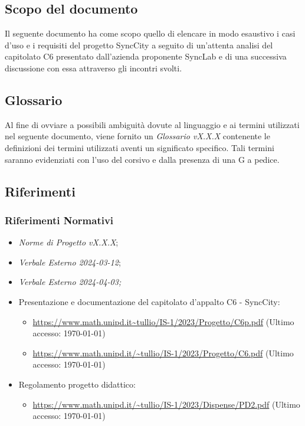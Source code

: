 \documentclass[8pt]{article}
\begin{document}
\subsection{Scopo del documento}
Il seguente documento ha come scopo quello di elencare in modo esaustivo i casi d'uso e i requisiti
del progetto SyncCity a seguito di un'attenta analisi del capitolato C6 presentato dall'azienda proponente SyncLab e di una successiva discussione con essa attraverso gli incontri svolti.

\subsection{Glossario}
Al fine di ovviare a possibili ambiguità dovute al linguaggio e ai termini utilizzati nel seguente
documento, viene fornito un \textit{Glossario vX.X.X} contenente le definizioni dei termini utilizzati aventi un significato specifico. Tali termini saranno evidenziati con l'uso del corsivo e dalla presenza di una G a pedice.
\subsection{Riferimenti}
\subsubsection{Riferimenti Normativi}
\begin{itemize}
	\setlength\itemsep{0em}
	\item \textit{Norme di Progetto vX.X.X};	
	\item \textit{Verbale Esterno 2024-03-12};
	\item \textit{Verbale Esterno 2024-04-03;}
  \item Presentazione e documentazione del capitolato d’appalto C6 - SyncCity:
	\begin{itemize}
		\item \href{https://www.math.unipd.it/~tullio/IS-1/2023/Progetto/C6p.pdf}{https://www.math.unipd.it\textasciitilde{}tullio/IS-1/2023/Progetto/C6p.pdf} (Ultimo accesso: \today)
		\item \href{https://www.math.unipd.it/~tullio/IS-1/2023/Progetto/C6.pdf}{https://www.math.unipd.it/\textasciitilde{}tullio/IS-1/2023/Progetto/C6.pdf} (Ultimo accesso: \today)
\end{itemize}
	\item Regolamento progetto didattico: 
      \begin{itemize}
          \item \href{https://www.math.unipd.it/~tullio/IS-1/2023/Dispense/PD2.pdf}{https://www.math.unipd.it/\textasciitilde{}tullio/IS-1/2023/Dispense/PD2.pdf} (Ultimo accesso: \today)
    \end{itemize}
\end{itemize}
\end{document}
